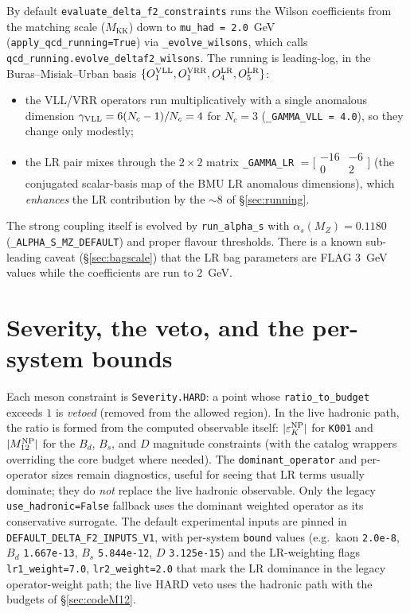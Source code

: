 \documentclass[11pt]{article}
\newcommand{\MKK}{M_{\mathrm{KK}}}
\newcommand{\Mtwelve}{M_{12}}
\newcommand{\Nc}{N_c}
\newcommand{\code}[1]{\texttt{#1}}
\theoremstyle{definition}
\begin{document}
By default \code{evaluate\_delta\_f2\_constraints} runs the Wilson coefficients
from the matching scale ($\MKK$) down to \code{mu\_had = 2.0}~GeV
(\code{apply\_qcd\_running=True}) via \code{\_evolve\_wilsons}, which calls
\code{qcd\_running.evolve\_deltaf2\_wilsons}. The running is leading-log, in the
Buras--Misiak--Urban basis $\{O_1^{\rm VLL}, O_1^{\rm VRR}, O_4^{\rm LR},
O_5^{\rm LR}\}$:
\begin{itemize}[leftmargin=1.4em]
\item the VLL/VRR operators run multiplicatively with a single anomalous dimension
$\gamma_{\rm VLL}=6(\Nc-1)/\Nc=4$ for $\Nc=3$ (\code{\_GAMMA\_VLL = 4.0}), so they
change only modestly;
\item the LR pair mixes through the $2\times2$ matrix \code{\_GAMMA\_LR}
$=\big[\!\begin{smallmatrix}-16 & -6\\ 0 & 2\end{smallmatrix}\!\big]$ (the
conjugated scalar-basis map of the BMU LR anomalous dimensions), which
\emph{enhances} the LR contribution by the $\sim8$ of \S\ref{sec:running}.
\end{itemize}
The strong coupling itself is evolved by \code{run\_alpha\_s} with
$\alpha_s(M_Z)=0.1180$ (\code{\_ALPHA\_S\_MZ\_DEFAULT}) and proper flavour
thresholds. There is a known sub-leading caveat (\S\ref{sec:bagscale}) that the LR
bag parameters are FLAG $3$~GeV values while the coefficients are run to $2$~GeV.

\section{Severity, the veto, and the per-system bounds}
\label{sec:codeVeto}

Each meson constraint is \code{Severity.HARD}: a point whose
\code{ratio\_to\_budget} exceeds $1$ is \emph{vetoed} (removed from the allowed
region). In the live hadronic path, the ratio is formed from the computed
observable itself: $|\varepsilon_K^{\rm NP}|$ for \code{K001} and
$|\Mtwelve^{\rm NP}|$ for the $B_d$, $B_s$, and $D$ magnitude constraints (with
the catalog wrappers overriding the core budget where needed). The
\code{dominant\_operator} and per-operator sizes remain diagnostics, useful for
seeing that LR terms usually dominate; they do \emph{not} replace the live
hadronic observable. Only the legacy \code{use\_hadronic=False} fallback uses the
dominant weighted operator as its conservative surrogate. The default experimental
inputs are pinned in \code{DEFAULT\_DELTA\_F2\_INPUTS\_V1}, with per-system
\code{bound} values (e.g.\ kaon \code{2.0e-8}, $B_d$ \code{1.667e-13}, $B_s$
\code{5.844e-12}, $D$ \code{3.125e-15}) and the LR-weighting flags
\code{lr1\_weight=7.0}, \code{lr2\_weight=2.0} that mark the LR dominance in the
legacy operator-weight path; the live HARD veto uses the hadronic path with the
budgets of \S\ref{sec:codeM12}.
\end{document}
